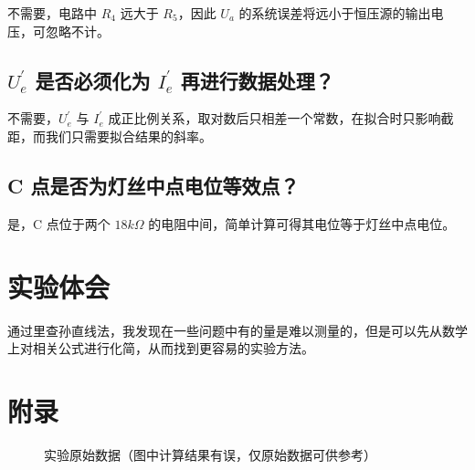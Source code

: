 \documentclass[a4paper]{article}
\begin{document}
\par 不需要，电路中 $R_4$ 远大于 $R_5$，因此 $U_a$ 的系统误差将远小于恒压源的输出电压，可忽略不计。

\subsection{$U_e^\prime$ 是否必须化为 $I_e^\prime$ 再进行数据处理？}

\par 不需要，$U_e^\prime$ 与 $I_e^\prime$ 成正比例关系，取对数后只相差一个常数，在拟合时只影响截距，而我们只需要拟合结果的斜率。

\subsection{C 点是否为灯丝中点电位等效点？}

\par 是，C 点位于两个 $18k\Omega$ 的电阻中间，简单计算可得其电位等于灯丝中点电位。

\section{实验体会}

\par 通过里查孙直线法，我发现在一些问题中有的量是难以测量的，但是可以先从数学上对相关公式进行化简，从而找到更容易的实验方法。

\newpage

\section{附录}

\begin{figure}[H]
	\centering
    \caption{实验原始数据（图中计算结果有误，仅原始数据可供参考）}
\end{figure}
\end{document}
